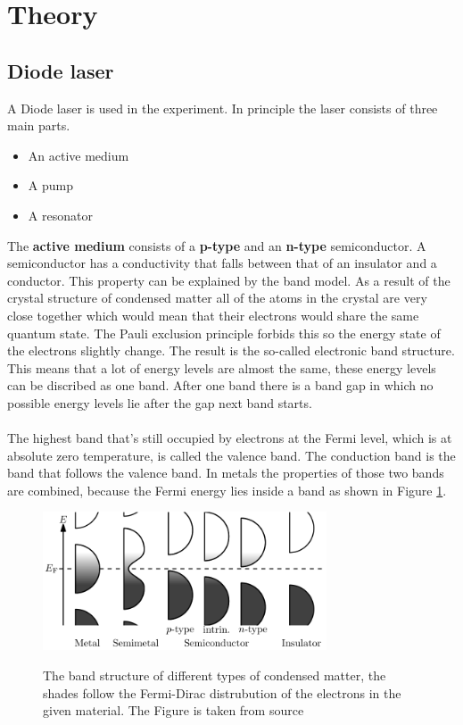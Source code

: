 \section{Theory}
\label{sec:Theorie}

\subsection{Diode laser}

A Diode laser is used in the experiment.
In principle the laser consists of three main parts.
\begin{itemize}
    \item An active medium
    \item A pump
    \item A resonator
\end{itemize}
The \textbf{active medium} consists of a \textbf{p-type} and an \textbf{n-type} semiconductor.
A semiconductor has a conductivity that falls between that of an insulator and a conductor.
This property can be explained by the band model. 
As a result of the crystal structure of condensed matter all of the atoms in the crystal are very close together which would mean that their electrons would share the same quantum state.
The Pauli exclusion principle forbids this so the energy state of the electrons slightly change.
The result is the so-called electronic band structure.
This means that a lot of energy levels are almost the same, these energy levels can be discribed as one band.
After one band there is a band gap in which no possible energy levels lie after the gap next band starts.
\\\\
The highest band that's still occupied by electrons at the Fermi level, which is at absolute zero temperature, is called the valence band.
The conduction band is the band that follows the valence band.
In metals the properties of those two bands are combined, because the Fermi energy lies inside a band as shown in Figure \ref{fig:band_structure}.

\begin{figure}
    \centering
    \caption{The band structure of different types of condensed matter, the shades follow the Fermi-Dirac distrubution of the electrons in the given material. The Figure is taken from source \cite{wikipedia_valence_conduction_band}}
    \includegraphics[width=0.75\textwidth]{content/data/Band_structure_diffrent_materials.png}
    \label{fig:band_structure}
\end{figure}

